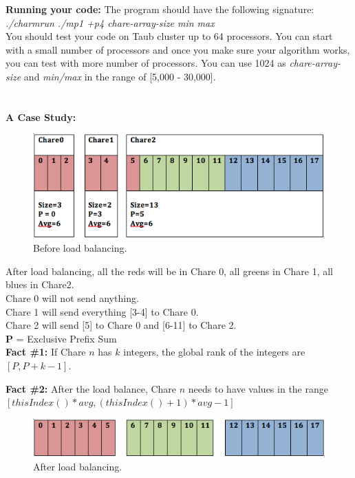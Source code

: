 \documentclass{article}
\begin{document}
\textbf{Running your code:}
The program should have the following signature: \\
\textit{./charmrun ./mp1 +p4 chare-array-size min max} \\

You should test your code on Taub cluster up to 64 processors. You can start with a small
number of processors and once you make sure your algorithm works, you can test
with more number of processors. You can use 1024 as
\textit{chare-array-size} and \textit{min/max} in the range of [5,000 - 30,000].
\\ \\ \\


\textbf{A Case Study:} 

\begin{figure}[h]
\centering
\includegraphics[width=\textwidth]{before_balance.png}
\caption{Before load balancing.}
\label{prefix}
\end{figure}

After load balancing, all the reds will be in Chare 0, all greens in Chare 1, all blues in Chare2. \\
Chare 0 will not send anything.\\
Chare 1 will send everything [3-4] to Chare 0.\\
Chare 2 will send [5] to Chare 0 and [6-11] to Chare 2.\\

\textbf{P} = Exclusive Prefix Sum \\

\textbf{Fact \#1:}
If Chare $n$ has $k$ integers, the global rank of the integers are $[P, P+k-1]$.

\textbf{Fact \#2:}
After the load balance, Chare $n$ needs to have values in the range 
$[thisIndex()*avg, (thisIndex()+1)*avg-1]$\\

\begin{figure}[h]
\centering
\includegraphics[width=\textwidth]{after_balance.png}
\caption{After load balancing.}
\label{prefix}
\end{figure}
\end{document}
